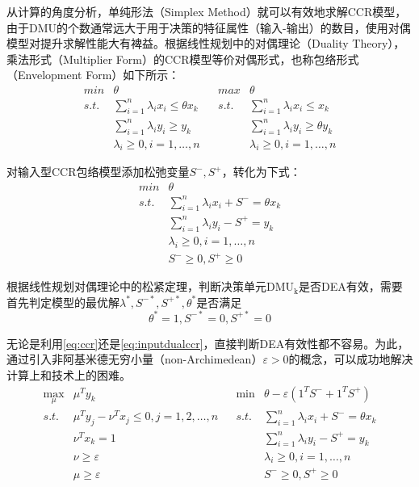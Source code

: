 从计算的角度分析，单纯形法（Simplex Method）就可以有效地求解CCR模型\cite{cooper2011data}，由于DMU的个数通常远大于用于决策的特征属性（输入-输出）的数目，使用对偶模型对提升求解性能大有裨益。根据线性规划中的对偶理论（Duality Theory），乘法形式（Multiplier Form）的CCR模型等价对偶形式，也称包络形式（Envelopment Form）如下所示：
\begin{equation}\label{eq:dualccr}
\begin{array}{lllll}
  \textit{min} & \theta & & \textit{max} & \theta\\
  \textit{s.t.} &  \sum\limits_{i = 1}^n \lambda_i x_i \le \theta x_k & & \textit{s.t.} & \sum\limits_{i = 1}^n \lambda_i x_i \le x_k\\
   & \sum\limits_{i = 1}^n \lambda_i y_i \ge y_k & & & \sum\limits_{i = 1}^n \lambda_i y_i \ge \theta y_k\\
   & \lambda_i \ge 0, i = 1, \ldots, n & & & \lambda_i \ge 0, i = 1, \ldots, n
\end{array}
\end{equation}

对输入型CCR包络模型添加松弛变量$S^{-},S^{+}$，转化为下式：
\begin{equation}\label{eq:inputdualccr}
\begin{array}{ll}
  \textit{min} & \theta\\
  \textit{s.t.} & \sum\limits_{i = 1}^n \lambda_i x_i + S^{-} = \theta x_k \\
   & \sum\limits_{i = 1}^n \lambda_i y_i - S^{+} = y_k\\
   & \lambda_i \ge 0, i = 1, \ldots, n\\
   & S^{-} \ge 0, S^{+}\ge 0
\end{array}
\end{equation}

根据线性规划对偶理论中的松紧定理，判断决策单元$\mathrm{DMU_k}$是否DEA有效，需要首先判定模型的最优解$\lambda^{*}, S^{-*},S^{+*},\theta^{*}$是否满足
\begin{equation}
  \theta^{*} = 1, S^{-*} = 0, S^{+*} = 0
\end{equation}

无论是利用\eqref{eq:ccr}还是\eqref{eq:inputdualccr}，直接判断DEA有效性都不容易。为此，通过引入非阿基米德无穷小量（non-Archimedean）$\varepsilon >0$的概念\cite{charnes1952optimality,charnes1957management}，可以成功地解决计算上和技术上的困难。
\begin{equation}\label{eq:eccr}
\begin{array}{lllll}
  \max\limits_{\mu} & \mu^Ty_k & & \min & \theta - \varepsilon(1^T S^{-} + 1^T S^{+}) \\
  \textit{s.t.} & \mu^Ty_j -\nu^Tx_j\leq 0, j=1,2,\dots,n & & \textit{s.t.} & \sum\limits_{i = 1}^n \lambda_i x_i + S^{-} = \theta x_k\\
   & \nu^Tx_k = 1 & & & \sum\limits_{i = 1}^n \lambda_i y_i - S^{+} = y_k\\
   & \nu\geq \varepsilon & & & \lambda_i \ge 0, i = 1, \ldots, n\\
   & \mu\geq \varepsilon & & & S^{-} \ge 0, S^{+}\ge 0
\end{array}
\end{equation}

